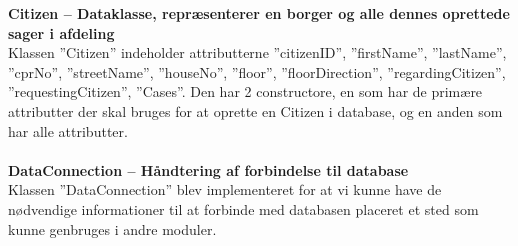 \textbf{Citizen – Dataklasse, repræsenterer en borger og alle dennes oprettede sager i afdeling}\\
Klassen ”Citizen” indeholder attributterne ”citizenID”, ”firstName”, ”lastName”, ”cprNo”, ”streetName”, ”houseNo”, ”floor”, ”floorDirection”, ”regardingCitizen”, ”requestingCitizen”, ”Cases”. Den har 2 constructore, en som har de primære attributter der skal bruges for at oprette en Citizen i database, og en anden som har alle attributter.\\\\
\textbf{DataConnection – Håndtering af forbindelse til database}\\
Klassen ”DataConnection” blev implementeret for at vi kunne have de nødvendige informationer til at forbinde med databasen placeret et sted som kunne genbruges i andre moduler. \\
